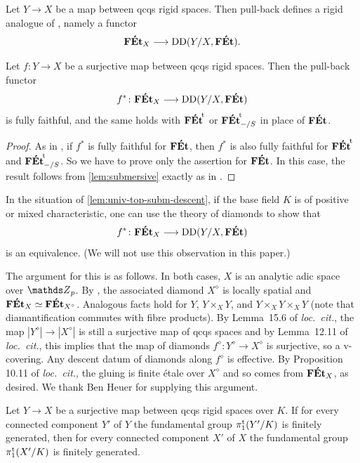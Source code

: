 Let $Y\to X$ be a map between qcqs rigid spaces. Then pull-back defines a rigid analogue of , namely a functor 
\[
    \mathbf{F\acute{E}t}_X\longrightarrow \operatorname{DD}(Y/X, \mathbf{F\acute{E}t}).
\]

\begin{lem} 
\label{lem:univ-top-subm-descent}
    Let $f\colon Y\to X$ be a surjective map between qcqs rigid spaces. Then the pull-back functor
    \[ 
       f^\ast \colon  \mathbf{F\acute{E}t}_X\longrightarrow \operatorname{DD}(Y/X, \mathbf{F\acute{E}t})
    \]
    is fully faithful, and the same holds with ${\mathbf{F\acute{E}t}}^{\!\mathrm{t}}$ or ${\mathbf{F\acute{E}t}}^{\!\mathrm{t}}_{-/S}$ in place of $\mathbf{F\acute{E}t}$.
\end{lem}

\begin{proof} 
As in , if $f^\ast$ is fully faithful for $\mathbf{F\acute{E}t}$, then $f^\ast$ is also fully faithful for ${\mathbf{F\acute{E}t}}^{\!\mathrm{t}}$ and ${\mathbf{F\acute{E}t}}^{\!\mathrm{t}}_{-/S}$.
So we have to prove only the assertion for $\mathbf{F\acute{E}t}$. In this case, the result follows from \cref{lem:submersive} exactly as in \cite[Exp.\ IX, Corollaire 3.3]{SGA1}.
\end{proof}

\begin{rmk}
In the situation of \cref{lem:univ-top-subm-descent}, if the base field $K$ is of positive or mixed characteristic, one can use the theory of diamonds \cite{ScholzeECoD} to show that    
    \[ 
       f^\ast \colon  \mathbf{F\acute{E}t}_X\longrightarrow \operatorname{DD}(Y/X, \mathbf{F\acute{E}t})
    \]
is an equivalence. (We will not use this observation in this paper.)

The argument for this is as follows. In both cases, $X$ is an analytic adic space over $\bZ_p$. By \cite[Lemma 15.6]{ScholzeECoD}, the associated diamond $X^{\diamond}$ is locally spatial and $\mathbf{F\acute{E}t}_X \simeq \mathbf{F\acute{E}t}_{X^\diamond}$. Analogous facts hold for $Y$, $Y\times_X Y$, and $Y\times_X Y \times_X Y$ (note that diamantification commutes with fibre products). By Lemma~15.6 of \emph{loc.~cit.}, the map $|Y^\diamond| \to |X^\diamond|$ is still a surjective map of qcqs spaces and by Lemma~12.11 of \emph{loc.~cit.}, this implies that the map of diamonds $f^\diamond \colon Y^\diamond \to X^\diamond$ is surjective, so a v-covering. Any descent datum of diamonds along $f^\diamond$ is effective. By Proposition 10.11 of \emph{loc.~cit.}, the gluing is finite \'etale over $X^\diamond$ and so comes from $\mathbf{F\acute{E}t}_X$, as desired. We thank Ben Heuer for supplying this argument. 
\end{rmk}

\begin{cor} \label{cor:descent-of-fg-fett}
    Let $Y\to X$ be a surjective map between qcqs rigid spaces over $K$. 
    If for every connected component $Y'$ of $Y$ the fundamental group $\pi_1^{\mathrm{t}}(Y'/K)$ is finitely generated, then for every connected component $X'$ of $X$ the fundamental group $\pi_1^{\mathrm{t}}(X'/K)$ is finitely generated.
\end{cor}

